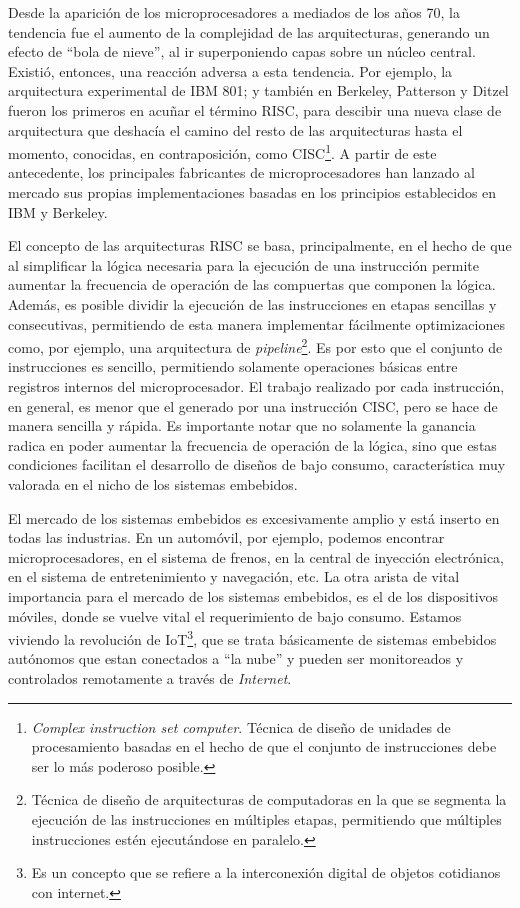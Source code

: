 \documentclass[a4paper]{article}
\begin{document}
Desde la aparición de los microprocesadores a mediados de los años 70, la tendencia fue el aumento de la complejidad de las arquitecturas, generando un efecto de ``bola de nieve'', al ir superponiendo capas sobre un núcleo central. Existió, entonces, una reacción adversa a esta tendencia. Por ejemplo, la arquitectura experimental de IBM 801; y también en Berkeley, Patterson y Ditzel fueron los primeros en acuñar el término RISC, para descibir una nueva clase de arquitectura que deshacía el camino del resto de las arquitecturas hasta el momento, conocidas, en contraposición, como CISC\footnote{\label{CISC} \emph{Complex instruction set computer}. Técnica de diseño de unidades de procesamiento basadas en el hecho de que el conjunto de instrucciones debe ser lo más poderoso posible.}. A partir de este antecedente, los principales fabricantes de microprocesadores han lanzado al mercado sus propias implementaciones basadas en los principios establecidos en IBM y Berkeley.

El concepto de las arquitecturas RISC se basa, principalmente, en el hecho de que al simplificar la lógica necesaria para la ejecución de una instrucción permite aumentar la frecuencia de operación de las compuertas que componen la lógica. Además, es posible dividir la ejecución de las instrucciones en etapas sencillas y consecutivas, permitiendo de esta manera implementar fácilmente optimizaciones como, por ejemplo, una arquitectura de \emph{pipeline}\footnote{\label{Pipeline} Técnica de diseño de arquitecturas de computadoras en la que se segmenta la ejecución de las instrucciones en múltiples etapas, permitiendo que múltiples instrucciones estén ejecutándose en paralelo.}. Es por esto que el conjunto de instrucciones es sencillo, permitiendo solamente operaciones básicas entre registros internos del microprocesador. El trabajo realizado por cada instrucción, en general, es menor que el generado por una instrucción CISC, pero se hace de manera sencilla y rápida. Es importante notar que no solamente la ganancia radica en poder aumentar la frecuencia de operación de la lógica, sino que estas condiciones facilitan el desarrollo de diseños de bajo consumo, característica muy valorada en el nicho de los sistemas embebidos.

El mercado de los sistemas embebidos es excesivamente amplio y está inserto en todas las industrias. En un automóvil, por ejemplo, podemos encontrar microprocesadores, en el sistema de frenos, en la central de inyección electrónica, en el sistema de entretenimiento y navegación, etc. La otra arista de vital importancia para el mercado de los sistemas embebidos, es el de los dispositivos móviles, donde se vuelve vital el requerimiento de bajo consumo. Estamos viviendo la revolución de IoT\footnote{\label{Internet of Things} Es un concepto que se refiere a la interconexión digital de objetos cotidianos con internet.}, que se trata básicamente de sistemas embebidos autónomos que estan conectados a ``la nube'' y pueden ser monitoreados y controlados remotamente a través de \emph{Internet}.
\end{document}
